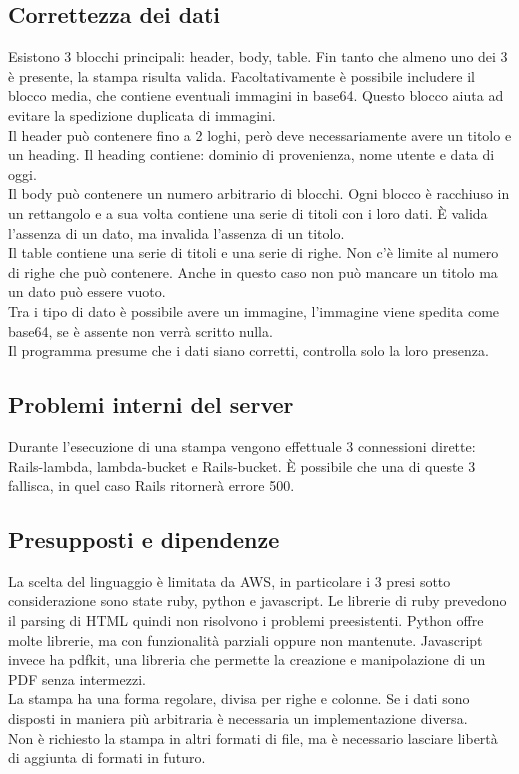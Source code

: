 \documentclass[12pt]{article}
\begin{document}
\subsection{Correttezza dei dati}
Esistono 3 blocchi principali: header, body, table.
Fin tanto che almeno uno dei 3 è presente, la stampa risulta valida.
Facoltativamente è possibile includere il blocco media, che contiene 
eventuali immagini in base64. Questo blocco aiuta ad evitare la spedizione duplicata 
di immagini.
\\ Il header può contenere fino a 2 loghi, però deve necessariamente avere 
un titolo e un heading. Il heading contiene: dominio di provenienza, nome utente 
e data di oggi.
\\ Il body può contenere un numero arbitrario di blocchi. Ogni blocco è racchiuso 
in un rettangolo e a sua volta contiene una serie di titoli con i loro dati. 
È valida l'assenza di un dato, ma invalida l'assenza di un titolo. 
\\ Il table contiene una serie di titoli e una serie di righe. Non c'è limite 
al numero di righe che può contenere.
Anche in questo caso non può mancare un titolo ma un dato può essere vuoto. 
\\ Tra i tipo di dato è possibile avere un immagine, l'immagine viene spedita come 
base64, se è assente non verrà scritto nulla. 
\\ Il programma presume che i dati siano corretti, controlla solo la loro presenza.

\subsection{Problemi interni del server}
Durante l'esecuzione di una stampa vengono effettuale 3 connessioni dirette:
Rails-lambda, lambda-bucket e Rails-bucket. È possibile che una di queste 3 
fallisca, in quel caso Rails ritornerà errore 500.

\subsection{Presupposti e dipendenze}
La scelta del linguaggio è limitata da AWS, in particolare i 3 presi sotto considerazione 
sono state ruby, python e javascript. 
Le librerie di ruby prevedono il parsing di HTML quindi non risolvono i problemi 
preesistenti. 
Python offre molte librerie, ma con funzionalità parziali oppure non mantenute. 
Javascript invece ha pdfkit, una libreria che permette la creazione e manipolazione 
di un PDF senza intermezzi. 
\\ La stampa ha una forma regolare, divisa per righe e colonne. Se i dati sono 
disposti in maniera più arbitraria è necessaria un implementazione diversa. 
\\ Non è richiesto la stampa in altri formati di file, ma è necessario lasciare 
libertà di aggiunta di formati in futuro.
\end{document}
